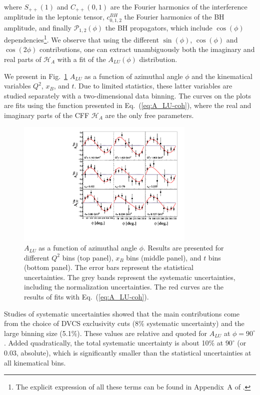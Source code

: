 \documentclass[twocolumn,nofootinbib,showpacs,prl,superscriptaddress,secnumarabic,amssymb,nobibnotes,aps,floatfix]{revtex4}
\begin{document}
where $S_{++}(1)$ and $C_{++}(0,1)$ are the Fourier harmonics of the 
interference amplitude in the leptonic tensor, $c_{0,1,2}^{BH}$ 
the Fourier harmonics of the BH amplitude, and
finally ${\mathcal P}_{1,2}(\phi)$ the BH
propagators, which include $\cos(\phi)$ dependencies\footnote{The explicit 
expression of all these terms can be found in Appendix~A of \cite{Armstrong:2017wfw}.}.
We observe that using the different $\sin(\phi)$, $\cos(\phi)$ and $\cos(2\phi)$ contributions, 
one can extract unambiguously both the imaginary and real parts of $\mathcal{H}_{A}$
with a fit of the $A_{LU}(\phi)$ distribution.

We present in Fig.~\ref{fig:alu} $A_{LU}$ as a function of azimuthal angle 
$\phi$ and the kinematical variables $Q^2$, $x_B$, and $t$. Due to limited 
statistics, these latter variables are studied separately with a two-dimensional 
data binning. The curves on 
the plots are fits using the function presented in Eq.~(\ref{eq:A_LU-coh}), 
where the real and imaginary parts of the CFF $\mathcal{H}_{A}$ are the only 
free parameters. 

\begin{figure}[tb]
   \centering
\includegraphics[width=8.5cm]{F_Coherent_ALU_phi.pdf}
\caption{$A_{LU}$ as a function of azimuthal angle $\phi$. Results are presented
   for different $Q^{2}$ bins (top panel), $x_{B}$ bins (middle panel), and $t$ 
   bins (bottom panel).  The error bars represent the statistical 
   uncertainties. The grey bands represent the systematic uncertainties, 
   including the normalization uncertainties. The red curves are the results of 
   fits with Eq.~(\ref{eq:A_LU-coh}).}
\label{fig:alu}
\end{figure}

Studies of systematic uncertainties showed that the main contributions 
come from the choice of DVCS exclusivity cuts (8\% systematic uncertainty) and the 
large binning size (5.1\%). These values are relative and quoted for $A_{LU}$
at $\phi=90^\circ$. Added quadratically, the total systematic uncertainty
is about 10\% at $90^\circ$ (or 0.03, absolute), which is significantly smaller
than the statistical uncertainties at all kinematical bins. 
\end{document}
